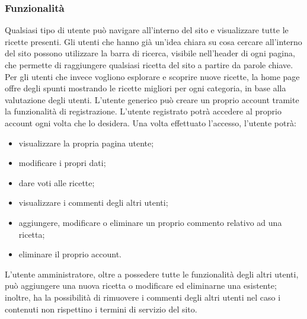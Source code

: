 \subsubsection{Funzionalità}
\label{subs:funzionalità}
Qualsiasi tipo di utente può navigare all'interno del sito e visualizzare tutte le ricette presenti.
Gli utenti che hanno già un'idea chiara su cosa cercare all'interno del sito possono utilizzare la barra di ricerca, visibile nell'header di ogni pagina, che permette di raggiungere qualsiasi ricetta del sito a partire da parole chiave. Per gli utenti che invece vogliono esplorare e scoprire nuove ricette, la home page offre degli spunti mostrando le ricette migliori per ogni categoria, in base alla valutazione degli utenti. \newline
L'utente generico può creare un proprio account tramite la funzionalità di registrazione. L'utente registrato potrà accedere al proprio account ogni volta che lo desidera. Una volta effettuato l'accesso, l'utente potrà:
\begin{itemize}
    \item visualizzare la propria pagina utente;
    \item modificare i propri dati;
    \item dare voti alle ricette;
    \item visualizzare i commenti degli altri utenti;
    \item aggiungere, modificare o eliminare un proprio commento relativo ad una ricetta;
    \item eliminare il proprio account.
\end{itemize}
L'utente amministratore, oltre a possedere tutte le funzionalità degli altri utenti, può aggiungere una nuova ricetta o modificare ed eliminarne una esistente; inoltre, ha la possibilità di rimuovere i commenti degli altri utenti nel caso i contenuti non rispettino i termini di servizio del sito.

